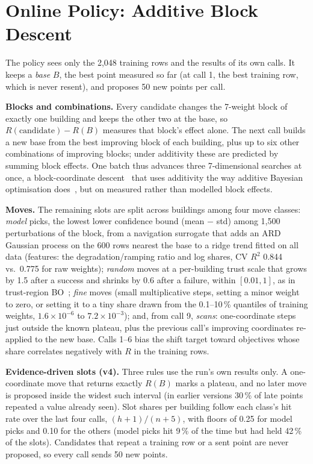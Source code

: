 \section{Online Policy: Additive Block Descent}
\label{sec:strategy}
The policy sees only the 2,048 training rows and the results of its own calls. It keeps a \emph{base} $B$, the best
point measured so far (at call 1, the best training row, which is never resent), and proposes 50 new points per call.

\textbf{Blocks and combinations.} Every candidate changes the 7-weight block of exactly one building and keeps the
other two at the base, so $R(\text{candidate})-R(B)$ measures that block's effect alone. The next call builds a new
base from the best improving block of each building, plus up to six other combinations of improving blocks; under
additivity these are predicted by summing block effects. One batch thus advances three 7-dimensional searches at once,
a block-coordinate descent~\cite{bcd} that uses additivity the way additive Bayesian optimisation does~\cite{addgp},
but on measured rather than modelled block effects.

\textbf{Moves.} The remaining slots are split across buildings among four move classes:
\emph{model} picks, the lowest lower confidence bound (mean $-$ std) among 1,500 perturbations of the block, from a
navigation surrogate that adds an ARD Gaussian process on the 600 rows nearest the base to a ridge trend fitted on all
data (features: the degradation/ramping ratio and log shares, CV $R^2$ 0.844 vs.\ 0.775 for raw weights);
\emph{random} moves at a per-building trust scale that grows by 1.5 after a success and shrinks by 0.6 after a
failure, within $[0.01,1]$, as in trust-region BO~\cite{turbo}; \emph{fine} moves (small multiplicative steps, setting
a minor weight to zero, or setting it to a tiny share drawn from the 0.1--10\,\% quantiles of training weights,
$1.6\times10^{-6}$ to $7.2\times10^{-3}$); and, from call 9, \emph{scans}: one-coordinate steps just outside the known
plateau, plus the previous call's improving coordinates re-applied to the new base. Calls 1--6 bias the shift
target toward objectives whose share correlates negatively with $R$ in the training rows.

\textbf{Evidence-driven slots (v4).} Three rules use the run's own results only. A one-coordinate move that returns
exactly $R(B)$ marks a plateau, and no later move is proposed inside the widest such interval (in earlier versions
30\,\% of late points repeated a value already seen). Slot shares per building follow each class's hit rate over the
last four calls, $(h+1)/(n+5)$, with floors of 0.25 for model picks and 0.10 for the others (model picks hit 9\,\% of the
time but had held 42\,\% of the slots). Candidates that repeat a training row or a sent point are never proposed, so
every call sends 50 new points.

